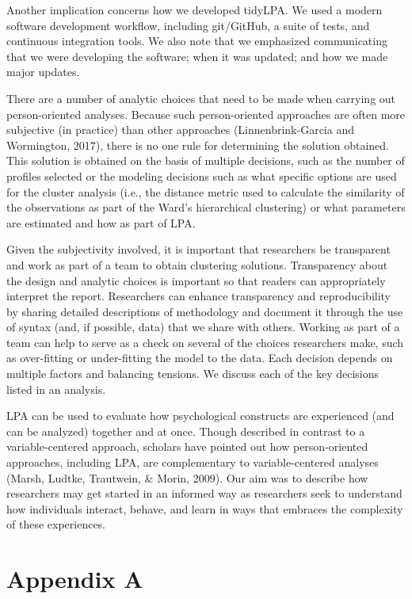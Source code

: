 \documentclass[man]{apa6}
\begin{document}
Another implication concerns how we developed tidyLPA. We used a modern software
development workflow, including git/GitHub, a suite of tests, and continuous
integration tools. We also note that we emphasized communicating that we were
developing the software; when it was updated; and how we made major updates.

There are a number of analytic choices that need to be made when carrying out
person-oriented analyses. Because such person-oriented approaches are often more
subjective (in practice) than other approaches (Linnenbrink-Garcia and
Wormington, 2017), there is no one rule for determining the solution obtained.
This solution is obtained on the basis of multiple decisions, such as the number
of profiles selected or the modeling decisions such as what specific options are
used for the cluster analysis (i.e., the distance metric used to calculate the
similarity of the observations as part of the Ward's hierarchical clustering) or
what parameters are estimated and how as part of LPA.

Given the subjectivity involved, it is important that researchers be transparent
and work as part of a team to obtain clustering solutions. Transparency about
the design and analytic choices is important so that readers can appropriately
interpret the report. Researchers can enhance transparency and reproducibility
by sharing detailed descriptions of methodology and document it through the use
of syntax (and, if possible, data) that we share with others. Working as part of
a team can help to serve as a check on several of the choices researchers make,
such as over-fitting or under-fitting the model to the data. Each decision
depends on multiple factors and balancing tensions. We discuss each of the key
decisions listed in an analysis.

LPA can be used to evaluate how psychological constructs are experienced (and
can be analyzed) together and at once. Though described in contrast to a
variable-centered approach, scholars have pointed out how person-oriented
approaches, including LPA, are complementary to variable-centered analyses
(Marsh, Ludtke, Trautwein, \& Morin, 2009). Our aim was to describe how
researchers may get started in an informed way as researchers seek to understand
how individuals interact, behave, and learn in ways that embraces the complexity
of these experiences.

\hypertarget{appendix-a}{%
\section{Appendix A}\label{appendix-a}}
\end{document}
